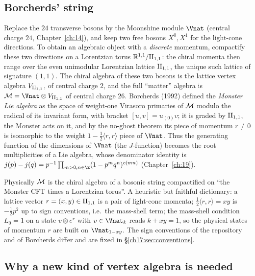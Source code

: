 \subsection{Borcherds' string}

Replace the $24$ transverse bosons by the Moonshine module $\Vnat$ (central charge $24$,
Chapter~\ref{ch:14}), and keep two free bosons $X^0,X^1$ for the light-cone directions.  To obtain an
algebraic object with a \emph{discrete} momentum, compactify these two directions on a Lorentzian torus
$\mathbb R^{1,1}/{\mathrm{II}_{1,1}}$: the chiral momenta then range over the even unimodular Lorentzian lattice
${\mathrm{II}_{1,1}}$, the unique such lattice of signature $(1,1)$.  The chiral algebra of these two bosons is
the lattice vertex algebra ${V_{\mathrm{II}_{1,1}}}$, of central charge $2$, and the full ``matter'' algebra is
$\chseventeenM=\Vnat\otimes\chseventeenVII$ of central charge $26$.  Borcherds (1992) defined the
\emph{Monster Lie algebra} as the space of weight-one Virasoro primaries of $\mathcal{M}$ modulo the
radical of its invariant form, with bracket $[u,v]=u_{(0)}v$; it is graded by ${\mathrm{II}_{1,1}}$, the
Monster acts on it, and by the no-ghost theorem its piece of momentum $r\ne0$ is isomorphic to the weight
$1-\tfrac12\langle r,r\rangle$ piece of $\Vnat$.  Thus the generating function of the dimensions of
$\Vnat$ (the $J$-function) becomes the root multiplicities of a Lie algebra, whose denominator identity
is $j(p)-j(q)=p^{-1}\prod_{m>0,n\in\Z}(1-p^mq^n)^{c(mn)}$ (Chapter~\ref{ch:19}).

\begin{physics}
Physically $\mathcal{M}$ is the chiral algebra of a bosonic string compactified on ``the Monster CFT
times a Lorentzian torus''.  A heuristic but faithful dictionary: a lattice vector $r=(x,y)\in{\mathrm{II}_{1,1}}$
is a pair of light-cone momenta; $\tfrac12\langle r,r\rangle=xy$ is $-\tfrac12p^2$ up to sign conventions, i.e.\
the mass-shell term; the mass-shell condition $L_0=1$ on a state $v\otimes e^r$ with $v\in\Vnat_k$ reads
$k+xy=1$, so the physical states of momentum $r$ are built on $\Vnat_{1-xy}$.  The sign conventions of the
repository and of Borcherds differ and are fixed in \S\ref{ch17:sec:conventions}.
\end{physics}

\subsection{Why a new kind of vertex algebra is needed}\label{ch17:sec:whynew}


